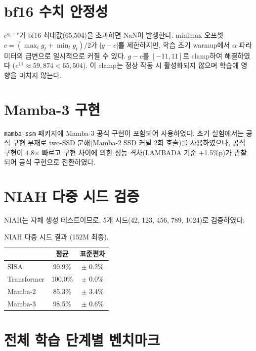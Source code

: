 \documentclass[11pt]{article}
\begin{document}
\section{bf16 수치 안정성}

$e^{g_i - c}$가 bf16 최대값(65,504)을 초과하면 NaN이 발생한다. minimax 오프셋 $c = (\max_t g_t + \min_t g_t) / 2$가 $|g-c|$를 제한하지만, 학습 초기 warmup에서 $\alpha$ 파라미터의 급변으로 일시적으로 커질 수 있다. $g-c$를 $[-11, 11]$로 clamp하여 해결하였다 ($e^{11} \approx 59,874 < 65,504$). 이 clamp는 정상 작동 시 활성화되지 않으며 학습에 영향을 미치지 않는다.

\section{Mamba-3 구현}

\texttt{mamba-ssm} 패키지에 Mamba-3 공식 구현이 포함되어 사용하였다. 초기 실험에서는 공식 구현 부재로 two-SSD 분해(Mamba-2 SSD 커널 2회 호출)를 사용하였으나, 공식 구현이 4.8$\times$ 빠르고 구현 차이에 의한 성능 격차(LAMBADA 기준 +1.5\%p)가 관찰되어 공식 구현으로 전환하였다.

\section{NIAH 다중 시드 검증}

NIAH는 자체 생성 테스트이므로, 5개 시드(42, 123, 456, 789, 1024)로 검증하였다:

\begin{table}[h]
\centering\small
\caption{NIAH 다중 시드 결과 (152M 최종).}
\begin{tabular}{lcc}
\toprule
& \textbf{평균} & \textbf{표준편차} \\
\midrule
SISA & 99.9\% & $\pm$ 0.2\% \\
Transformer & 100.0\% & $\pm$ 0.0\% \\
Mamba-2 & 85.3\% & $\pm$ 3.4\% \\
Mamba-3 & 98.5\% & $\pm$ 0.6\% \\
\bottomrule
\end{tabular}
\end{table}

\section{전체 학습 단계별 벤치마크}
\end{document}
